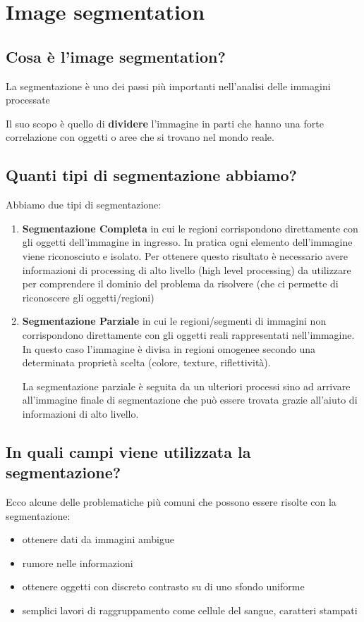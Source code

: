 \section{Image segmentation} \label{sec:seg}  
\subsection{Cosa è l'image segmentation?}
La segmentazione è uno dei passi più importanti nell'analisi delle immagini processate

Il suo scopo è quello di \textbf{dividere} l'immagine in parti che hanno una forte correlazione con oggetti o aree che si trovano nel mondo reale.

\subsection{Quanti tipi di segmentazione abbiamo?}
Abbiamo due tipi di segmentazione:

\begin{enumerate}
\item \textbf{Segmentazione Completa} in cui le regioni corrispondono direttamente con gli oggetti dell'immagine in ingresso. In pratica ogni elemento dell'immagine viene riconosciuto e isolato. Per ottenere questo risultato è necessario avere informazioni di processing di alto livello (high level processing) da utilizzare per comprendere il dominio del problema da risolvere (che ci permette di riconoscere gli oggetti/regioni)

\item \textbf{Segmentazione Parziale} in cui le regioni/segmenti di immagini non corrispondono direttamente con gli oggetti reali rappresentati nell'immagine. In questo caso l'immagine è divisa in regioni omogenee secondo una determinata proprietà scelta (colore, texture, riflettività).

La segmentazione parziale è seguita da un ulteriori processi sino ad arrivare all'immagine finale di segmentazione che può essere trovata grazie all'aiuto di informazioni di alto livello.
\end{enumerate}

\subsection{In quali campi viene utilizzata la segmentazione?}
Ecco alcune delle problematiche più comuni che possono essere risolte con la segmentazione:
\begin{itemize}
\item ottenere dati da immagini ambigue
\item rumore nelle informazioni
\item ottenere oggetti con discreto contrasto su di uno sfondo uniforme
\item semplici lavori di raggruppamento come cellule del sangue, caratteri stampati
\end{itemize}

